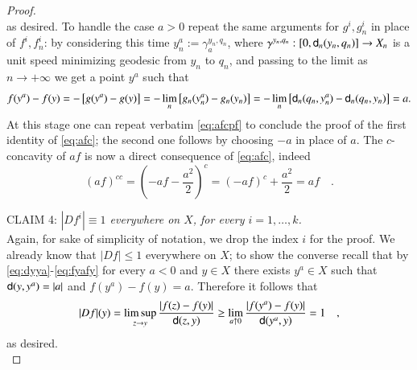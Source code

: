 \documentclass[11pt,reqno]{amsart}
\newcommand{\sfd}{{\sf d}}
\theoremstyle{definition}
\theoremstyle{remark}
\theoremstyle{remark}
\theoremstyle{remark}
\theoremstyle{remark}
\theoremstyle{remark}
\theoremstyle{remark}
\theoremstyle{remark}
\begin{document}
\begin{proof}
\begin{equation}
\end{equation}
as desired. To handle the case $a>0$ repeat the same arguments for $g^i,g^i_n$ in place of $f^i,f^i_n$: by considering this time $y^a_n:=\gamma^{y_n,q_n}_{a}$, where $\gamma^{y_n,q_n}:[0, \sfd_n(y_n,q_n)]\to X_n$ is a unit speed minimizing geodesic from $y_n$ to $q_n$, and passing to the limit as $n\to +\infty$ we get a point $y^a$ such that
$$f(y^a)-f(y)=-\left[g(y^a)-g(y)\right]=-  \lim_{n} \left[ g_n(y^a_n)-g_n(y_n) \right] = - \lim_{n} \left[ \sfd_n(q_n,y^a_n)-\sfd_n(q_n,y_n) \right] =a. $$
At this stage one can repeat verbatim \eqref{eq:afcpf} to conclude the proof of the first identity of  \eqref{eq:afc}; the second one follows by choosing $-a$ in place of $a$. The $c$-concavity of $af$ is now a direct consequence of \eqref{eq:afc}, indeed 
$$(af)^{cc}= \left(-a f- \frac{a^2}{2}  \right)^c= (-af)^c+ \frac{a^2}{2}=af \quad. $$

CLAIM 4: \emph{$|Df^i|\equiv 1$ everywhere on $X$, for every $i=1,\ldots,k$.}
\\Again, for sake of simplicity of notation, we  drop  the index $i$ for the proof. We already know that $|Df|\leq 1$ everywhere on $X$; to show the converse recall that by \eqref{eq:dyya}-\eqref{eq:fyafy} for every $a<0$ and $y \in X$ there exists $y^a \in X$ such that $\sfd(y,y^a)=|a|$ and $f(y^a)-f(y)=a$. Therefore it follows that
$$|Df|(y)=\limsup_{z\to y} \frac{|f(z)-f(y)|}{\sfd(z,y)}\geq \lim_{a\uparrow 0} \frac{|f(y^a)-f(y)|}{\sfd(y^a,y)}=1\quad,$$
as desired.
\\


\end{proof}
\end{document}
